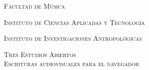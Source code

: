 \documentclass[11pt]{article}
\begin{document}
\begin{titlepage}
\begin{center}
             \vspace{0.5cm}                                                                                                                                                          
           
           {\scshape\large Facultad de Música \par}
           {\scshape\large Instituto de Ciencias Aplicadas y Tecnología \par}
           {\scshape\large Instituto de Investigaciones Antropológicas \par}

           \vfill
           \vspace{0.5cm}
        
                  
           {\scshape\Huge   Tres Estudios Abiertos \\

             

             \Large Escrituras audiovisuales para el navegador\par}
            
             
                  

           
           \vspace{0.5cm}
       

\end{center}
\end{titlepage}
\end{document}
